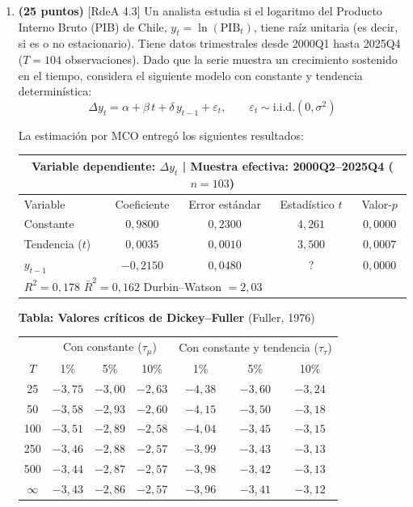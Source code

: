 \documentclass[12pt,letterpaper]{article}
\newcommand{\rdea}[1]{\textsf{\small [RdeA #1]}}
\begin{document}
\begin{enumerate}
\item \textbf{(25 puntos)} \rdea{4.3}
Un analista estudia si el logaritmo del Producto Interno Bruto (PIB) de Chile,
$y_t = \ln(\text{PIB}_t)$, tiene raíz unitaria (es decir, si es o no estacionario). Tiene datos trimestrales desde 2000Q1 hasta 2025Q4
($T = 104$ observaciones). Dado que la serie muestra un crecimiento sostenido en el tiempo,
considera el siguiente modelo con constante y tendencia determinística:
\begin{equation*}
\Delta y_t = \alpha + \beta\, t + \delta\, y_{t-1} + \varepsilon_t ,
\qquad \varepsilon_t \sim \text{i.i.d.}(0,\sigma^2)
\end{equation*}

La estimación por MCO entregó los siguientes resultados:

\begin{center}
\begin{tabular}{lcccc}
\hline
\multicolumn{5}{c}{Variable dependiente: $\Delta y_t$ \quad | \quad Muestra efectiva: 2000Q2--2025Q4 ($n=103$)} \\
\hline
Variable & Coeficiente & Error estándar & Estadístico $t$ & Valor-$p$ \\
\hline
Constante        & $0{,}9800$  & $0{,}2300$ & $4{,}261$  & $0{,}0000$ \\
Tendencia ($t$)  & $0{,}0035$  & $0{,}0010$ & $3{,}500$  & $0{,}0007$ \\
$y_{t-1}$        & $-0{,}2150$ & $0{,}0480$ & $\;\;?\;\;$ & $0{,}0000$ \\
\hline
\multicolumn{5}{l}{$R^2 = 0{,}178$ \qquad $\bar R^2 = 0{,}162$ \qquad Durbin--Watson $= 2{,}03$} \\
\hline
\end{tabular}
\end{center}

\noindent\textbf{Tabla: Valores críticos de Dickey--Fuller} (Fuller, 1976)

\begin{center}
\begin{tabular}{c|ccc|ccc}
\hline
 & \multicolumn{3}{c|}{Con constante ($\tau_\mu$)}
 & \multicolumn{3}{c}{Con constante y tendencia ($\tau_\tau$)} \\
$T$ & 1\% & 5\% & 10\% & 1\% & 5\% & 10\% \\
\hline
25       & $-3{,}75$ & $-3{,}00$ & $-2{,}63$ & $-4{,}38$ & $-3{,}60$ & $-3{,}24$ \\
50       & $-3{,}58$ & $-2{,}93$ & $-2{,}60$ & $-4{,}15$ & $-3{,}50$ & $-3{,}18$ \\
100      & $-3{,}51$ & $-2{,}89$ & $-2{,}58$ & $-4{,}04$ & $-3{,}45$ & $-3{,}15$ \\
250      & $-3{,}46$ & $-2{,}88$ & $-2{,}57$ & $-3{,}99$ & $-3{,}43$ & $-3{,}13$ \\
500      & $-3{,}44$ & $-2{,}87$ & $-2{,}57$ & $-3{,}98$ & $-3{,}42$ & $-3{,}13$ \\
$\infty$ & $-3{,}43$ & $-2{,}86$ & $-2{,}57$ & $-3{,}96$ & $-3{,}41$ & $-3{,}12$ \\
\hline
\end{tabular}
\end{center}


\end{enumerate}
\end{document}
